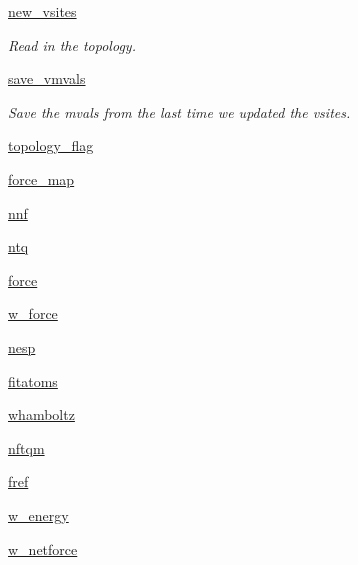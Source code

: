 \begin{DoxyCompactItemize}
\hyperlink{classforcebalance_1_1abinitio_1_1AbInitio_a64f1aeadac4d7b09424c20b83e5ad5af}{new\-\_\-vsites}
\begin{DoxyCompactList}\small\item\em Read in the topology. \end{DoxyCompactList}\item 
\hyperlink{classforcebalance_1_1abinitio_1_1AbInitio_a22037bf43728fa45f387390005e0b131}{save\-\_\-vmvals}
\begin{DoxyCompactList}\small\item\em Save the mvals from the last time we updated the vsites. \end{DoxyCompactList}\item 
\hyperlink{classforcebalance_1_1abinitio_1_1AbInitio_a09689e626b75720b097c36f922507950}{topology\-\_\-flag}
\item 
\hyperlink{classforcebalance_1_1abinitio_1_1AbInitio_a6558ea4f56053b0f539f987481c57a75}{force\-\_\-map}
\item 
\hyperlink{classforcebalance_1_1abinitio_1_1AbInitio_ac4a5765bf5b089176518f47004fcdb39}{nnf}
\item 
\hyperlink{classforcebalance_1_1abinitio_1_1AbInitio_af8a895f61ddea6b9ca2765ddbf309a75}{ntq}
\item 
\hyperlink{classforcebalance_1_1abinitio_1_1AbInitio_ab483592ce22356d09b52eb594f2f4b8e}{force}
\item 
\hyperlink{classforcebalance_1_1abinitio_1_1AbInitio_a4ec4863edbb6ea4a28777de905d621d3}{w\-\_\-force}
\item 
\hyperlink{classforcebalance_1_1abinitio_1_1AbInitio_ac258ad6180275ba2ffe5f68d1217e4ac}{nesp}
\item 
\hyperlink{classforcebalance_1_1abinitio_1_1AbInitio_a8b12ea0418108cc6c7693d75cc00227f}{fitatoms}
\item 
\hyperlink{classforcebalance_1_1abinitio_1_1AbInitio_a8f70f017ca8ec54c1acdbc85eff06ab9}{whamboltz}
\item 
\hyperlink{classforcebalance_1_1abinitio_1_1AbInitio_a64ae24d7e979723e65358e227b132a4a}{nftqm}
\item 
\hyperlink{classforcebalance_1_1abinitio_1_1AbInitio_ac974dfef45b416947dd21876443d808a}{fref}
\item 
\hyperlink{classforcebalance_1_1abinitio_1_1AbInitio_aa7f09e2ffc1253844c9f0736caf9b9e5}{w\-\_\-energy}
\item 
\hyperlink{classforcebalance_1_1abinitio_1_1AbInitio_af7cbfd50ca6a0b408c417e8d3bdb7cf3}{w\-\_\-netforce}
\item 

\end{DoxyCompactItemize}

